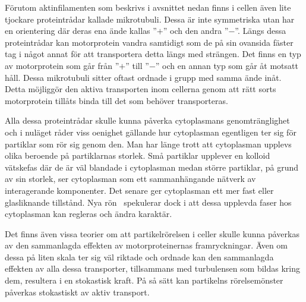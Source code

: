 Förutom aktinfilamenten som beskrivs i avsnittet nedan finns i cellen även lite tjockare proteintrådar kallade mikrotubuli. Dessa är inte symmetriska utan har en orientering där deras ena ände kallas ''$+$'' och den andra ''$-$''. Längs dessa proteintrådar kan motorprotein vandra samtidigt som de på sin ovansida fäster tag i något annat för att transportera detta längs med strängen. Det finns en typ av motorprotein som går från ''$+$'' till ''$-$'' och en annan typ som går åt motsatt håll. Dessa mikrotubuli sitter oftast ordnade i grupp med samma ände inåt. Detta möjliggör den aktiva transporten inom cellerna genom att rätt sorts motorprotein tillåts binda till det som behöver transporteras. 


Alla dessa proteintrådar skulle kunna påverka cytoplasmans genomtränglighet och i nuläget råder viss oenighet gällande hur cytoplasman egentligen ter sig för partiklar som rör sig genom den. Man har länge trott att cytoplasman upplevs olika beroende på partiklarnas storlek. Små partiklar upplever en kolloid vätskefas där de är väl blandade i cytoplasman medan större partiklar, på grund av sin storlek, ser cytoplasman som ett sammanhängande nätverk av interagerande komponenter. Det senare ger cytoplasman ett mer fast eller glasliknande tillstånd. Nya rön~\cite{Parry_etal2014} spekulerar dock i att dessa upplevda faser hos cytoplasman kan regleras och ändra karaktär.

Det finns även vissa teorier om att partikelrörelsen i celler skulle kunna påverkas av den sammanlagda effekten av motorproteinernas framryckningar. Även om dessa på liten skala ter sig väl riktade och ordnade kan den sammanlagda effekten av alla dessa transporter, tillsammans med turbulensen som bildas kring dem, resultera i en stokastisk kraft. På så sätt kan partikelns rörelsemönster påverkas stokastiskt av aktiv transport. 

